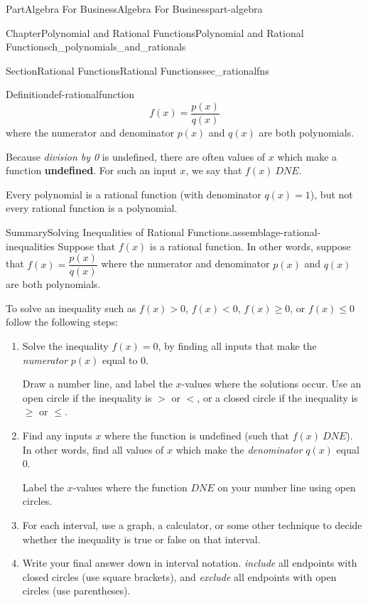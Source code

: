 \documentclass[oneside,10pt,]{tufte-book}
\newcommand{\terminology}[1]{\textbf{#1}}
\numberwithin{equation}{chapter}
\newcommand{\lt}{<}
\newcommand{\gt}{>}
\begin{document}
\begin{partptx}{Part}{Algebra For Business}{}{Algebra For Business}{}{}{part-algebra}
\begin{chapterptx}{Chapter}{Polynomial and Rational Functions}{}{Polynomial and Rational Functions}{}{}{ch_polynomials_and_rationals}
\begin{sectionptx}{Section}{Rational Functions}{}{Rational Functions}{}{}{sec_rationalfns}
\begin{definition}{Definition}{}{def-rationalfunction}
\begin{equation*}
f(x) = \dfrac{p(x)}{q(x)}
\end{equation*}
where the numerator and denominator \(p(x)\) and  \(q(x)\) are both polynomials.%
\par
Because \emph{division by 0} is undefined, there are often values of \(x\) which make a function \terminology{undefined}.  For such an input \(x\), we say that \(f(x)\ DNE\).%
\end{definition}
Every polynomial is a rational function (with denominator \(q(x)=1\)), but not every rational function is a polynomial.%
\begin{assemblage}{Summary}{Solving Inequalities of Rational Functions.}{assemblage-rational-inequalities}%
Suppose that \(f(x)\) is a rational function.  In other words, suppose that \(f(x) = \dfrac{p(x)}{q(x)}\) where the numerator and denominator \(p(x)\) and  \(q(x)\) are both polynomials.%
\par
To solve an inequality such as  \(f(x) \gt 0\), \(f(x) \lt 0\), \(f(x)\geq 0\), or \(f(x)\leq 0\) follow the following steps:%
\par
%
\begin{enumerate}
\item{}Solve the inequality \(f(x) = 0\), by finding all inputs that make the \emph{numerator} \(p(x)\) equal to \(0\).%
\par
Draw a number line, and label the \(x\)-values where the solutions occur. Use an open circle if the inequality is \(\gt\) or \(\lt\), or a closed circle if the inequality is \(\geq\) or \(\leq\).%
\item{}Find any inputs \(x\) where the function is undefined (such that \(f(x)\ DNE\)). In other words, find all values of \(x\) which make the \emph{denominator} \(q(x)\) equal \(0\).%
\par
Label the \(x\)-values where the function \(DNE\) on your number line using open circles.%
\item{}For each interval, use a graph, a calculator, or some other technique to decide whether the inequality is true or false on that interval.%
\item{}Write your final answer down in interval notation.  \emph{include} all endpoints with closed circles (use square brackets), and \emph{exclude} all endpoints with open circles (use parentheses).%
\end{enumerate}
%
\end{assemblage}
\end{sectionptx}
\end{chapterptx}

\end{partptx}
\end{document}

